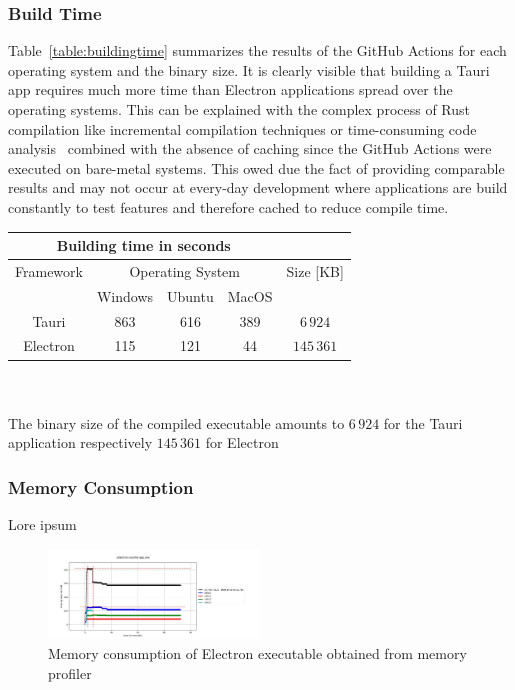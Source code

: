 \subsubsection{Build Time}
\label{subsubsec:perf:buildtime}
Table~\ref{table:buildingtime} summarizes the results of the GitHub Actions for each operating system and the binary size.
It is clearly visible that building a Tauri app requires much more time than Electron applications spread over the operating systems.
This can be explained with the complex process of Rust compilation like incremental compilation techniques or time-consuming code analysis~\cite{rustCompileTime} combined with the absence
of caching since the GitHub Actions were executed on bare-metal systems.
This owed due the fact of providing comparable results and may not occur at every-day development where applications are build constantly to test features and therefore cached to reduce compile time.
\\
\begin{tabular} {| c | c | c | c | c |}
    \hline
    \multicolumn{4}{|c|}{Building time in seconds} & \\ \hline
    Framework & \multicolumn{3}{|c|}{Operating System} & Size [KB]  \\ \hline
    & Windows & Ubuntu & MacOS &  \\ \hline
    Tauri & 863 & 616 & 389 & $6\,924$  \\ \hline
    Electron & 115 & 121 & 44 & $145\,361$ \\ \hline
\end{tabular}
\label{table:buildingtime}
\\ \\

The binary size of the compiled executable amounts to $6\,924$ for the Tauri application respectively $145\,361$ for Electron
\subsubsection{Memory Consumption}
\label{subsubsec:perf:memory}

Lore ipsum \\
\begin{figure}[ht]
    \centering
    \includegraphics[width=0.5\textwidth]{images/ElectronMemCons.jpeg}
    \caption[Bla]{Memory consumption of Electron executable obtained from memory profiler}
    \label{fig:electron:memory}
\end{figure}
